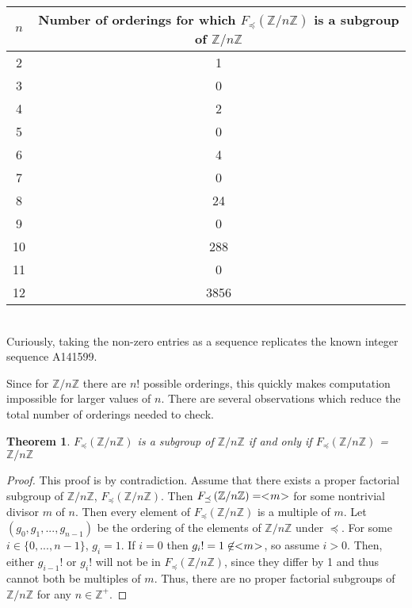 \documentclass{article}
\newcommand{\ZZ}{\mathbb{Z}}
\newcommand{\ZnZ}{\ZZ/n\ZZ}
\newcommand{\FZ}{F_{\preceq}\left(\ZZ/n\ZZ\right)}
\newtheorem{theorem}{Theorem}
\begin{document}
\begin{tabular}{|c|c|}
\hline
$n$ & Number of orderings for which $F_\preceq(\ZZ/n\ZZ)$ is a subgroup of $\ZZ/n\ZZ$\\
\hline
2 & 1\\
\hline
3 & 0\\
\hline
4 & 2\\
\hline
5 & 0\\
\hline
6 & 4\\
\hline
7 & 0\\
\hline
8 & 24\\
\hline
9 & 0\\
\hline
10 & 288\\
\hline
11 & 0\\
\hline
12 & 3856\\
\hline
\end{tabular} \vspace{0.1in}
\\Curiously, taking the non-zero entries as a sequence replicates the known integer sequence A141599.
\par Since for $\ZnZ$ there are $n!$ possible orderings, this quickly makes computation impossible for larger values of $n$. There are several observations which reduce the total number of orderings needed to check.
\begin{theorem}
$\FZ$ is a subgroup of $\ZnZ$ if and only if $\FZ$ = $\ZnZ$
\end{theorem}

\begin{proof} This proof is by contradiction. Assume that there exists a proper factorial subgroup of $\ZnZ$, $\FZ$. Then $\FZ=< \negmedspace m \negmedspace >$ for some nontrivial divisor $m$ of $n$. Then every element of $\FZ$ is a multiple of $m$. Let $(g_0,g_1,...,g_{n-1})$ be the ordering of the elements of $\ZnZ$ under $\preceq$. For some $i\in\{0,...,n-1\}$, $g_i=1$. If $i=0$ then $g_i!=1\not\in < \negmedspace m \negmedspace >$, so assume $i>0$. Then, either $g_{i-1}!$ or $g_i!$ will not be in $\FZ$, since they differ by 1 and thus cannot both be multiples of $m$. Thus, there are no proper factorial subgroups of $\ZnZ$ for any $n\in\mathbb{Z}^+$. 
\end{proof}
\end{document}
